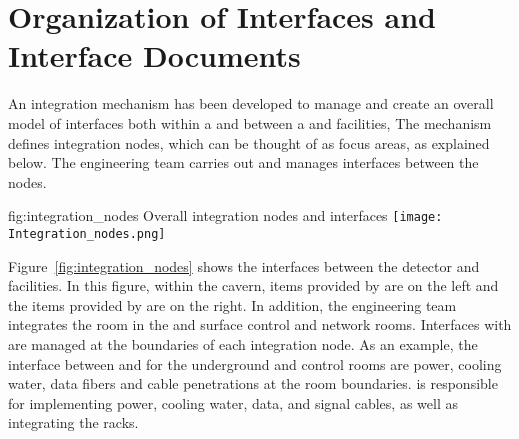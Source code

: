 \section{Organization of Interfaces and Interface Documents}
\label{sec:fdsp-coord-integ-interface}

An integration mechanism has been developed to manage and create an overall model of interfaces both within a  and between a  and facilities,
The mechanism %
defines integration nodes, which can be thought of as focus areas, as
explained below.  The  engineering team carries out  and manages interfaces between the nodes.%


\begin{dunefigure}{fig:integration_nodes}
  {Overall integration nodes and interfaces}
  \texttt{[image: Integration\_nodes.png]}
\end{dunefigure}

Figure~\ref{fig:integration_nodes} shows the interfaces between the
detector and facilities. In this figure, within the cavern, items
provided by  are on the left and the items provided by
 are on the right. In addition, the  engineering
team integrates the  room in the  and
surface control and network rooms.  Interfaces with  are
managed at the boundaries of each integration node. As an example, the
interface between  and  for the underground
 and control rooms are power, cooling water, data fibers
and cable penetrations at the room boundaries.  is responsible 
for implementing power,
cooling water, data, and signal cables, as well as integrating the
racks. %


